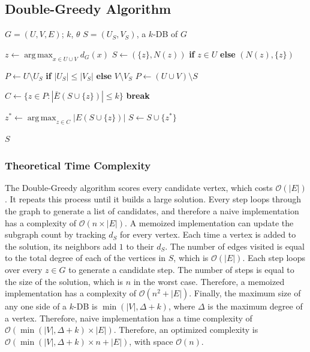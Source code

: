 \documentclass[conference]{IEEEtran}
\begin{document}
\subsection{Double-Greedy Algorithm}

\begin{algorithm}[H]
\caption{Double-Greedy Algorithm for $k$-MDB}
\label{alg:double-greedy}
\begin{algorithmic}[1]
   \Require $G = (U, V, E)$; $k$, $\theta$
   \Ensure $S = (U_S, V_S)$, a $k$-DB of $G$

   \State $z \gets \operatorname*{arg\,max}_{x \in U \cup V} d_G(x)$
   \State $S \gets (\{z\}, N(z))$ \textbf{if} $z \in U$ \textbf{else} $(N(z), \{z\})$

           \State $P \gets U \setminus U_S$ \textbf{if} $|U_S| \le |V_S|$ \textbf{else} $V \setminus V_S$
       \Else
           \State $P \gets (U \cup V) \setminus S$
       \EndIf

       \State $C \gets \{z \in P : |\bar{E}(S \cup \{z\})| \le k\}$
           \State \textbf{break}
       \EndIf

       \State $z^* \gets \operatorname*{arg\,max}_{z \in C} |E(S \cup \{z\})|$
       \State $S \gets S \cup \{z^*\}$
   \EndWhile

   \State \Return $S$
\end{algorithmic}
\end{algorithm}

\subsubsection{Theoretical Time Complexity}
The Double-Greedy algorithm scores every candidate vertex, which costs $\mathcal{O}(|E|)$. It repeats this process until it builds a large solution. Every step loops through the graph to generate a list of candidates,  and therefore a naive implementation has a complexity of $\mathcal{O}(n \times |E|)$. A memoized implementation can update the subgraph count by tracking $d_S$ for every vertex. Each time a vertex is added to the solution, its neighbors add $1$ to their $d_S$. The number of edges visited is equal to the total degree of each of the vertices in $S$, which is $\mathcal{O}(|E|)$. Each step loops over every $z \in G$ to generate a candidate step. The number of steps is equal to the size of the solution, which is $n$ in the worst case. Therefore, a memoized implementation has a complexity of $\mathcal{O}(n^2 + |E|)$. Finally, the maximum size of any one side of a $k$-DB is $\min(|V|, \Delta + k)$, where $\Delta$ is the maximum degree of a vertex. Therefore, naive implementation has a time complexity of $\mathcal{O}(\min(|V|, \Delta + k) \times |E|)$. Therefore, an optimized complexity is $\mathcal{O}(\min(|V|, \Delta + k) \times n + |E|)$, with space $\mathcal{O}(n)$.
\end{document}
